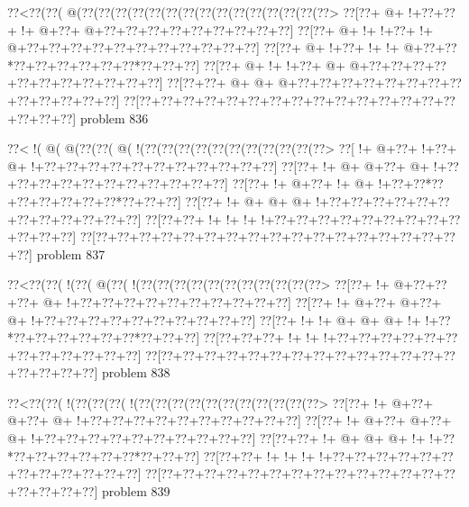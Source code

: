 \vbox{\vbox{\goo
\0??<\0??(\0??(\- @(\0??(\0??(\0??(\0??(\0??(\0??(\0??(\0??(\0??(\0??(\0??(\0??(\0??(\0??(\0??>
\0??[\0??+\- @+\- !+\0??+\0??+\- !+\- @+\0??+\- @+\0??+\0??+\0??+\0??+\0??+\0??+\0??+\0??+\0??]
\0??[\0??+\- @+\- !+\- !+\0??+\- !+\- @+\0??+\0??+\0??+\0??+\0??+\0??+\0??+\0??+\0??+\0??+\0??]
\0??[\0??+\- @+\- !+\0??+\- !+\- !+\- @+\0??+\0??*\0??+\0??+\0??+\0??+\0??+\0??*\0??+\0??+\0??]
\0??[\0??+\- @+\- !+\- !+\0??+\- @+\- @+\0??+\0??+\0??+\0??+\0??+\0??+\0??+\0??+\0??+\0??+\0??]
\0??[\0??+\0??+\- @+\- @+\- @+\0??+\0??+\0??+\0??+\0??+\0??+\0??+\0??+\0??+\0??+\0??+\0??+\0??]
\0??[\0??+\0??+\0??+\0??+\0??+\0??+\0??+\0??+\0??+\0??+\0??+\0??+\0??+\0??+\0??+\0??+\0??+\0??]
}
\hfil problem 836\hfil\break
}



\vbox{\vbox{\goo
\0??<\- !(\- @(\- @(\0??(\0??(\- @(\- !(\0??(\0??(\0??(\0??(\0??(\0??(\0??(\0??(\0??(\0??(\0??>
\0??[\- !+\- @+\0??+\- !+\0??+\- @+\- !+\0??+\0??+\0??+\0??+\0??+\0??+\0??+\0??+\0??+\0??+\0??]
\0??[\0??+\- !+\- @+\- @+\0??+\- @+\- !+\0??+\0??+\0??+\0??+\0??+\0??+\0??+\0??+\0??+\0??+\0??]
\0??[\0??+\- !+\- @+\0??+\- !+\- @+\- !+\0??+\0??*\0??+\0??+\0??+\0??+\0??+\0??*\0??+\0??+\0??]
\0??[\0??+\- !+\- @+\- @+\- @+\- !+\0??+\0??+\0??+\0??+\0??+\0??+\0??+\0??+\0??+\0??+\0??+\0??]
\0??[\0??+\0??+\- !+\- !+\- !+\- !+\0??+\0??+\0??+\0??+\0??+\0??+\0??+\0??+\0??+\0??+\0??+\0??]
\0??[\0??+\0??+\0??+\0??+\0??+\0??+\0??+\0??+\0??+\0??+\0??+\0??+\0??+\0??+\0??+\0??+\0??+\0??]
}
\hfil problem 837\hfil\break
}



\vbox{\vbox{\goo
\0??<\0??(\0??(\- !(\0??(\- @(\0??(\- !(\0??(\0??(\0??(\0??(\0??(\0??(\0??(\0??(\0??(\0??(\0??>
\0??[\0??+\- !+\- @+\0??+\0??+\0??+\- @+\- !+\0??+\0??+\0??+\0??+\0??+\0??+\0??+\0??+\0??+\0??]
\0??[\0??+\- !+\- @+\0??+\- @+\0??+\- @+\- !+\0??+\0??+\0??+\0??+\0??+\0??+\0??+\0??+\0??+\0??]
\0??[\0??+\- !+\- !+\- @+\- @+\- @+\- !+\- !+\0??*\0??+\0??+\0??+\0??+\0??+\0??*\0??+\0??+\0??]
\0??[\0??+\0??+\0??+\- !+\- !+\- !+\0??+\0??+\0??+\0??+\0??+\0??+\0??+\0??+\0??+\0??+\0??+\0??]
\0??[\0??+\0??+\0??+\0??+\0??+\0??+\0??+\0??+\0??+\0??+\0??+\0??+\0??+\0??+\0??+\0??+\0??+\0??]
}
\hfil problem 838\hfil\break
}



\vbox{\vbox{\goo
\0??<\0??(\0??(\- !(\0??(\0??(\0??(\- !(\0??(\0??(\0??(\0??(\0??(\0??(\0??(\0??(\0??(\0??(\0??>
\0??[\0??+\- !+\- @+\0??+\- @+\0??+\- @+\- !+\0??+\0??+\0??+\0??+\0??+\0??+\0??+\0??+\0??+\0??]
\0??[\0??+\- !+\- @+\0??+\- @+\0??+\- @+\- !+\0??+\0??+\0??+\0??+\0??+\0??+\0??+\0??+\0??+\0??]
\0??[\0??+\0??+\- !+\- @+\- @+\- @+\- !+\- !+\0??*\0??+\0??+\0??+\0??+\0??+\0??*\0??+\0??+\0??]
\0??[\0??+\0??+\- !+\- !+\- !+\- !+\0??+\0??+\0??+\0??+\0??+\0??+\0??+\0??+\0??+\0??+\0??+\0??]
\0??[\0??+\0??+\0??+\0??+\0??+\0??+\0??+\0??+\0??+\0??+\0??+\0??+\0??+\0??+\0??+\0??+\0??+\0??]
}
\hfil problem 839\hfil\break
}



